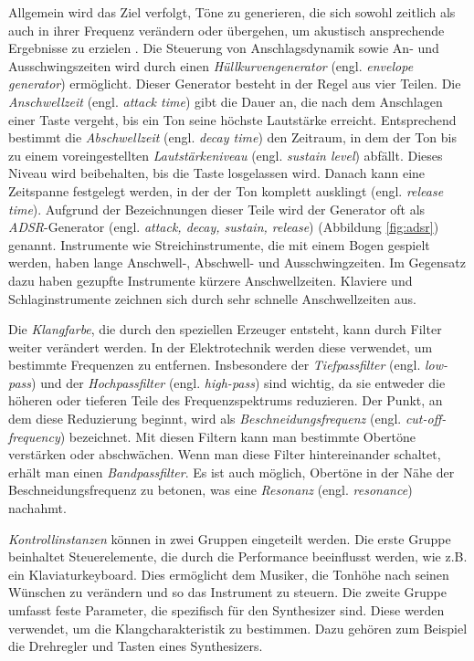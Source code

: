 \documentclass[
  a4paper,  %
  twoside,  %
  bibliography=totoc,
  headsepline,
  cleardoublepage=empty,
  parskip=half,
  draft=false
]{scrbook}
\begin{document}
Allgemein wird das Ziel verfolgt, Töne zu generieren, die sich sowohl zeitlich als auch in ihrer Frequenz verändern oder übergehen, um akustisch ansprechende Ergebnisse zu erzielen \cite{pirkle_designing_2021}. Die Steuerung von Anschlagsdynamik sowie An- und Ausschwingszeiten wird durch einen \emph{Hüllkurvengenerator} (engl. \emph{envelope generator}) ermöglicht. Dieser Generator besteht in der Regel aus vier Teilen. Die \emph{Anschwellzeit} (engl. \emph{attack time}) gibt die Dauer an, die nach dem Anschlagen einer Taste vergeht, bis ein Ton seine höchste Lautstärke erreicht. Entsprechend bestimmt die \emph{Abschwellzeit} (engl. \emph{decay time}) den Zeitraum, in dem der Ton bis zu einem voreingestellten \emph{Lautstärkeniveau} (engl. \emph{sustain level}) abfällt. Dieses Niveau wird beibehalten, bis die Taste losgelassen wird. Danach kann eine Zeitspanne festgelegt werden, in der der Ton komplett ausklingt (engl. \emph{release time}). Aufgrund der Bezeichnungen dieser Teile wird der Generator oft als \emph{ADSR}-Generator (engl. \emph{attack, decay, sustain, release}) (Abbildung \ref{fig:adsr}) genannt. Instrumente wie Streichinstrumente, die mit einem Bogen gespielt werden, haben lange Anschwell-, Abschwell- und Ausschwingzeiten. Im Gegensatz dazu haben gezupfte Instrumente kürzere Anschwellzeiten. Klaviere und Schlaginstrumente zeichnen sich durch sehr schnelle Anschwellzeiten aus. \cite{ruschkowski_elektronische_2019, russ_sound_2009}

Die \emph{Klangfarbe}, die durch den speziellen Erzeuger entsteht, kann durch Filter weiter verändert werden. In der Elektrotechnik werden diese verwendet, um bestimmte Frequenzen zu entfernen. Insbesondere der \emph{Tiefpassfilter} (engl. \emph{low-pass}) und der \emph{Hochpassfilter} (engl. \emph{high-pass}) sind wichtig, da sie entweder die höheren oder tieferen Teile des Frequenzspektrums reduzieren. Der Punkt, an dem diese Reduzierung beginnt, wird als \emph{Beschneidungsfrequenz} (engl. \emph{cut-off-frequency}) bezeichnet. Mit diesen Filtern kann man bestimmte Obertöne verstärken oder abschwächen. Wenn man diese Filter hintereinander schaltet, erhält man einen \emph{Bandpassfilter}. Es ist auch möglich, Obertöne in der Nähe der Beschneidungsfrequenz zu betonen, was eine \emph{Resonanz} (engl. \emph{resonance}) nachahmt. \cite{ruschkowski_elektronische_2019}

\emph{Kontrollinstanzen} können in zwei Gruppen eingeteilt werden. Die erste Gruppe beinhaltet Steuerelemente, die durch die Performance beeinflusst werden, wie z.B. ein Klaviaturkeyboard. Dies ermöglicht dem Musiker, die Tonhöhe nach seinen Wünschen zu verändern und so das Instrument zu steuern. Die zweite Gruppe umfasst feste Parameter, die spezifisch für den Synthesizer sind. Diese werden verwendet, um die Klangcharakteristik zu bestimmen. Dazu gehören zum Beispiel die Drehregler und Tasten eines Synthesizers. \cite{russ_sound_2009}
\end{document}
